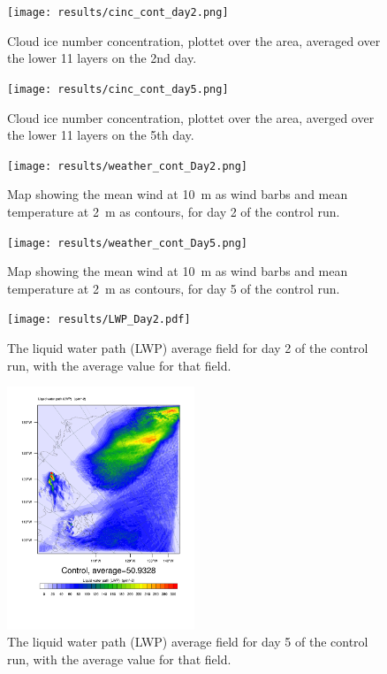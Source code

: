 \begin{figure}[h]
\centering
\texttt{[image: results/cinc\_cont\_day2.png]}
\caption{Cloud ice number concentration, plottet over the area, averaged over the lower 11 layers on the 2nd day.}
\label{fig:cinc_cont_Day2}
\end{figure}

\begin{figure}[h]
\centering
\texttt{[image: results/cinc\_cont\_day5.png]}
\caption{Cloud ice number concentration, plottet over the area, averged over the lower 11 layers on the 5th day.}
\label{fig:cinc_cont_Day5}
\end{figure}

\begin{figure}[h]
\centering
\texttt{[image: results/weather\_cont\_Day2.png]}
\caption{Map showing the mean wind at 10~m as wind barbs and mean temperature at 2~m as contours, for day 2 of the control run.}
\label{fig:weather_cont_Day2}
\end{figure}

\begin{figure}[h]
\centering
\texttt{[image: results/weather\_cont\_Day5.png]}
\caption{Map showing the mean wind at 10~m as wind barbs and mean temperature at 2~m as contours, for day 5 of the control run.}
\label{fig:weather_cont_Day5}
\end{figure}


\begin{figure}[h]
\centering
\texttt{[image: results/LWP\_Day2.pdf]}
\caption{The liquid water path (LWP) average field for day 2 of the control run, with the average value for that field.}
\label{fig:LWPr1Day2}
\end{figure}

\begin{figure}[h]
\centering
\includegraphics[width=0.5\textwidth]{results/LWP_Day5.pdf}
\caption{The liquid water path (LWP) average field for day 5 of the control run, with the average value for that field.}
\label{fig:LWPr1Day5}
\end{figure}

